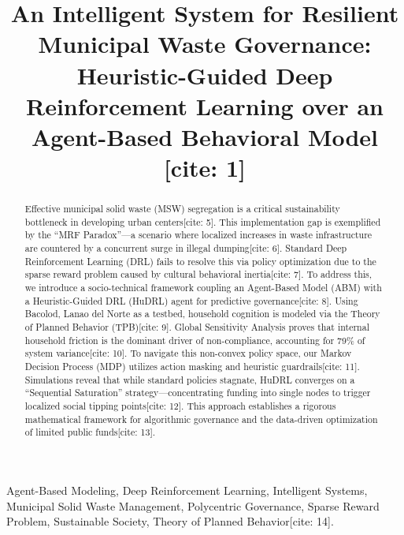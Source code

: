 \documentclass[conference]{IEEEtran}
\begin{document}
\title{An Intelligent System for Resilient Municipal Waste Governance: Heuristic-Guided Deep Reinforcement Learning over an Agent-Based Behavioral Model [cite: 1]}

\author{
}

\maketitle

\begin{abstract}
Effective municipal solid waste (MSW) segregation is a critical sustainability bottleneck in developing urban centers[cite: 5]. This implementation gap is exemplified by the ``MRF Paradox''—a scenario where localized increases in waste infrastructure are countered by a concurrent surge in illegal dumping[cite: 6]. Standard Deep Reinforcement Learning (DRL) fails to resolve this via policy optimization due to the sparse reward problem caused by cultural behavioral inertia[cite: 7]. To address this, we introduce a socio-technical framework coupling an Agent-Based Model (ABM) with a Heuristic-Guided DRL (HuDRL) agent for predictive governance[cite: 8]. Using Bacolod, Lanao del Norte as a testbed, household cognition is modeled via the Theory of Planned Behavior (TPB)[cite: 9]. Global Sensitivity Analysis proves that internal household friction is the dominant driver of non-compliance, accounting for 79\% of system variance[cite: 10]. To navigate this non-convex policy space, our Markov Decision Process (MDP) utilizes action masking and heuristic guardrails[cite: 11]. Simulations reveal that while standard policies stagnate, HuDRL converges on a ``Sequential Saturation'' strategy—concentrating funding into single nodes to trigger localized social tipping points[cite: 12]. This approach establishes a rigorous mathematical framework for algorithmic governance and the data-driven optimization of limited public funds[cite: 13].
\end{abstract}

\begin{IEEEkeywords}
Agent-Based Modeling, Deep Reinforcement Learning, Intelligent Systems, Municipal Solid Waste Management, Polycentric Governance, Sparse Reward Problem, Sustainable Society, Theory of Planned Behavior[cite: 14].
\end{IEEEkeywords}
\end{document}
